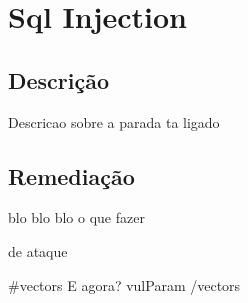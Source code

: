 \section{Sql Injection}

\subsection {Descrição}
Descricao sobre a parada ta ligado

\subsection {Remediação}
blo blo blo o que fazer

\Vetores de ataque

{{#vectors }}
E agora? {{ vulParam }}
{{/vectors}}

